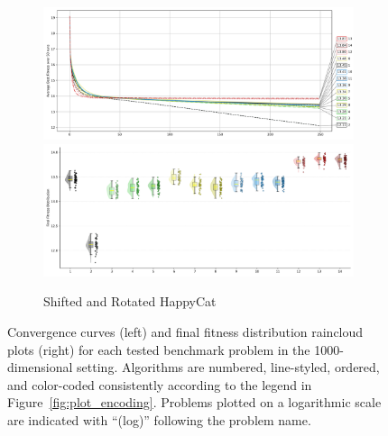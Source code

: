 \begin{figure}[p]
\begin{subfigure}{1\textwidth}
    \centering
    \includegraphics[width=.49\textwidth]{Figures/results/1000/Shifted_and_Rotated_HappyCat_All_selected_algorithms_dim1000_annot_legend.png}
    \includegraphics[width=.49\textwidth]{Figures/results/1000/Shifted_and_Rotated_HappyCat_all_dim1000_raincloud_vertical.png}
    \caption{Shifted and Rotated HappyCat}
\end{subfigure}

\captionsetup{list=no}
\caption[Convergence curves and final fitness distribution raincloud plots for 1000-dimensional problems]{Convergence curves (left) and final fitness distribution raincloud plots (right) for each tested benchmark problem in the 1000-dimensional setting. Algorithms are numbered, line-styled, ordered, and color-coded consistently according to the legend in Figure~\ref{fig:plot_encoding}. Problems plotted on a logarithmic scale are indicated with ``(log)'' following the problem name.}
\end{figure}





